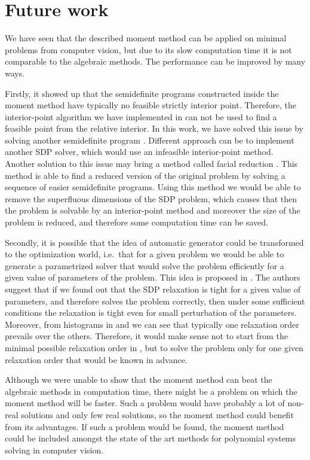 \section{Future work}
We have seen that the described moment method can be applied on minimal problems from computer vision, but due to its slow computation time it is not comparable to the algebraic methods.
The performance can be improved by many ways.

Firstly, it showed up that the semidefinite programs constructed inside the moment method have typically no feasible strictly interior point.
Therefore, the interior-point algorithm we have implemented in  can not be used to find a feasible point from the relative interior.
In this work, we have solved this issue by solving another semidefinite program .
Different approach can be to implement another SDP solver, which would use an infeasible interior-point method.
Another solution to this issue may bring a method called facial reduction \cite{facial}.
This method is able to find a reduced version of the original problem by solving a sequence of easier semidefinite programs.
Using this method we would be able to remove the superfluous dimensions of the SDP problem, which causes that then the problem is solvable by an interior-point method and moreover the size of the problem is reduced, and therefore some computation time can be saved.

Secondly, it is possible that the idea of automatic generator \cite{autogen} could be transformed to the optimization world, i.e.\ that for a given problem we would be able to generate a parametrized solver that would solve the problem efficiently for a given value of parameters of the problem.
This idea is proposed in \cite{SDPstability}.
The authors suggest that if we found out that the SDP relaxation is tight for a given value of parameters, and therefore solves the problem correctly, then under some sufficient conditions the relaxation is tight even for small perturbation of the parameters.
Moreover, from histograms in  and  we can see that typically one relaxation order prevails over the others.
Therefore, it would make sense not to start from the minimal possible relaxation order in , but to solve the problem only for one given relaxation order that would be known in advance.

Although we were unable to show that the moment method can beat the algebraic methods in computation time, there might be a problem on which the moment method will be faster.
Such a problem would have probably a lot of non-real solutions and only few real solutions, so the moment method could benefit from its advantages.
If such a problem would be found, the moment method could be included amongst the state of the art methods for polynomial systems  solving in computer vision.

